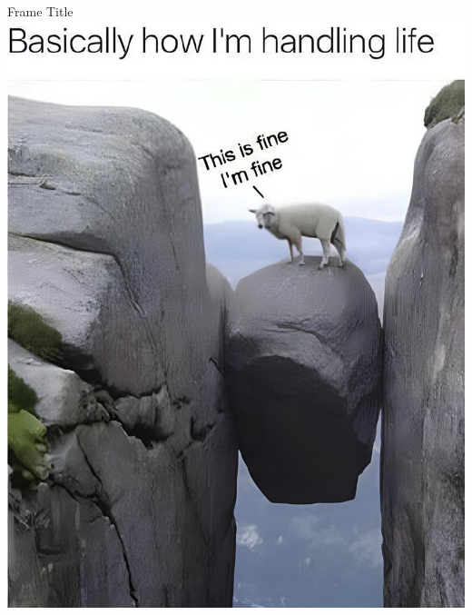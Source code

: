 \documentclass[notes=show]{beamer} %
\begin{document}
\begin{frame}{Frame Title}
\includegraphics[scale=.25]{fig/sheep.jpg}
\end{frame}



\end{document}

